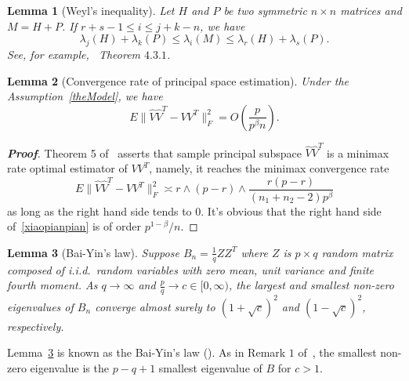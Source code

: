 \documentclass[review]{elsarticle}
\theoremstyle{plain}
\newtheorem{corollary}{\quad\quad Corollary}
\newtheorem{lemma}{\quad\quad Lemma}
\theoremstyle{definition}
\theoremstyle{remark}
\begin{document}
\begin{lemma}[Weyl's inequality]
Let $H$ and $P$ be two symmetric $n\times n$ matrices and $M=H+P$. If $r+s-1 \leq  i\leq j+k-n$, we have
\begin{equation*}
\lambda_j(H)+\lambda_k(P)\leq \lambda_i(M) \leq \lambda_r(H)+\lambda_s(P).
\end{equation*}
    See, for example,~\cite{Horn1985Matrix} Theorem $4.3.1$.
\end{lemma}


\begin{lemma}[Convergence rate of principal space estimation]\label{conRateLemma}
    Under the Assumption~\ref{theModel}, we have
\begin{equation*}
E\|\hat{V}\hat{V}^T-VV^T\|^2_F =O(\frac{p}{p^{\beta}n}).
\end{equation*}
\end{lemma}


\begin{proof}[\textbf{Proof}]
    Theorem 5 of~\cite{Cai2012Sparse} asserts that sample principal subspace $\hat{V}\hat{V}^T$ is a minimax rate optimal estimator of $VV^T$, namely, it reaches the minimax convergence rate
    \begin{equation}\label{xiaopianpian}
         E\|\hat{V}\hat{V}^T-VV^T\|^2_F\asymp r\wedge (p-r)\wedge \frac{r(p-r)}{(n_1+n_2-2)p^\beta}
    \end{equation}
    as long as the right hand side tends to $0$. 
    It's obvious that the right hand side of~\eqref{xiaopianpian} is of order ${p^{1-\beta}}/{n}$.
\end{proof}
\begin{lemma}[Bai-Yin's law]\label{baiyin}
    Suppose $B_n=\frac{1}{q} Z Z^T$ where $Z$ is $p\times q$ random matrix composed of i.i.d.\ random variables with zero mean, unit variance and finite fourth moment.
    As $q\to \infty$ and $\frac{p}{q}\to c\in [0,\infty)$, the largest and smallest non-zero eigenvalues of $B_n$ converge almost surely to ${(1+\sqrt{c})}^2$ and $(1-\sqrt{c})^2$, respectively.
\end{lemma}
    Lemma~\ref{baiyin} is known as the Bai-Yin's law (\cite{bai1993limit}). As in Remark $1$ of~\cite{bai1993limit}, the smallest non-zero eigenvalue is the $p-q+1$ smallest eigenvalue of $B$ for $c>1$.
\end{document}
